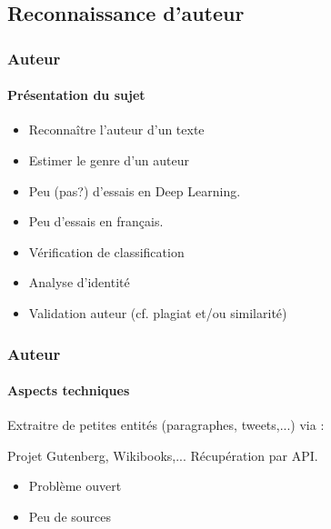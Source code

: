 \subsection{Reconnaissance d'auteur}
\begin{frame}
	\frametitle{Auteur}
	\framesubtitle{Présentation du sujet}
		\begin{itemize}
			\item Reconnaître l'auteur d'un texte
			\item Estimer le genre d'un auteur
		\end{itemize}
	
		\begin{itemize}
			\item Peu (pas?) d'essais en Deep Learning.
			\item Peu d'essais en français.
		\end{itemize}

		\begin{itemize}
			\item Vérification de classification
			\item Analyse d'identité
			\item Validation auteur (cf. plagiat et/ou similarité)
		\end{itemize}
\end{frame}

\begin{frame}
	\frametitle{Auteur}
	\framesubtitle{Aspects techniques}

		Extraitre de petites entités (paragraphes, tweets,...) via :
		\begin{itemize}
			Projet Gutenberg, Wikibooks,...
			Récupération par API.
		\end{itemize}

	\paraTitle{Complexité}
		\begin{itemize}
			\item Problème ouvert
			\item Peu de sources		
		\end{itemize}
\end{frame}


